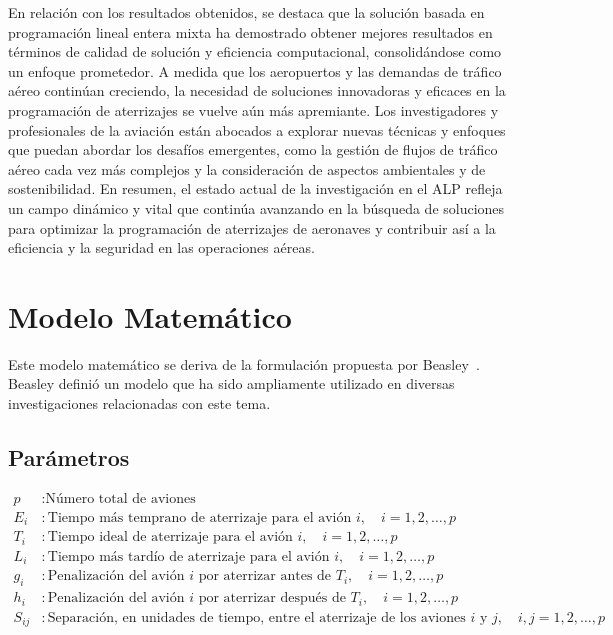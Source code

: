\documentclass[letter, 10pt]{article}
\begin{document}
En relaci\'on con los resultados obtenidos, se destaca que la soluci\'on basada en programaci\'on lineal entera mixta ha demostrado obtener mejores resultados en t\'erminos de calidad de soluci\'on y eficiencia computacional, consolid\'andose como un enfoque prometedor. A medida que los aeropuertos y las demandas de tr\'afico a\'ereo contin\'uan creciendo, la necesidad de soluciones innovadoras y eficaces en la programaci\'on de aterrizajes se vuelve a\'un m\'as apremiante. Los investigadores y profesionales de la aviaci\'on est\'an abocados a explorar nuevas t\'ecnicas y enfoques que puedan abordar los desaf\'ios emergentes, como la gesti\'on de flujos de tr\'afico a\'ereo cada vez m\'as complejos y la consideraci\'on de aspectos ambientales y de sostenibilidad. En resumen, el estado actual de la investigaci\'on en el ALP refleja un campo din\'amico y vital que contin\'ua avanzando en la b\'usqueda de soluciones para optimizar la programaci\'on de aterrizajes de aeronaves y contribuir as\'i a la eficiencia y la seguridad en las operaciones a\'ereas.

\newpage
\section{Modelo Matem\'atico}
Este modelo matem\'atico se deriva de la formulaci\'on propuesta por Beasley~\cite{beasley1990scheduling}. Beasley defini\'o un modelo que ha sido ampliamente utilizado en diversas investigaciones relacionadas con este tema.

\subsection{Par\'ametros}
\begin{align*}
p & : \text{N\'umero total de aviones} \\
E_i & : \text{Tiempo m\'as temprano de aterrizaje para el avi\'on } i, \quad i = 1,2,\ldots,p \\
T_i & : \text{Tiempo ideal de aterrizaje para el avi\'on } i, \quad i = 1,2,\ldots,p \\
L_i & : \text{Tiempo m\'as tard\'io de aterrizaje para el avi\'on } i, \quad i = 1,2,\ldots,p \\
g_i & : \text{Penalizaci\'on del avi\'on } i \text{ por aterrizar antes de } T_i, \quad i = 1,2,\ldots,p \\
h_i & : \text{Penalizaci\'on del avi\'on } i \text{ por aterrizar despu\'es de } T_i, \quad i = 1,2,\ldots,p \\
S_{ij} & : \text{Separaci\'on, en unidades de tiempo, entre el aterrizaje de los aviones } i \text{ y } j, \quad i, j = 1,2,\ldots,p \\
\end{align*}
\end{document}
